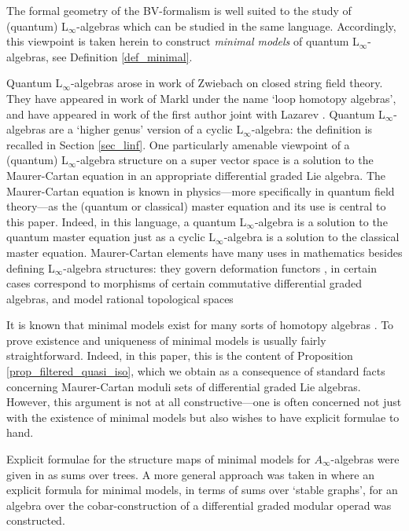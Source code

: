 \documentclass[]{amsart}
\theoremstyle{definition}
\newcommand{\Linf}{L$_\infty$}
\begin{document}
The formal geometry of the BV-formalism is well suited to the study of (quantum) \Linf-algebras which can be studied in the same language. Accordingly, this viewpoint is taken herein to construct \emph{minimal models} of quantum \Linf-algebras, see Definition \ref{def_minimal}.

Quantum \Linf-algebras arose in work of Zwiebach \cite{zwiebach} on closed string field theory. They have appeared in work of Markl \cite{markl_loop_homotopy} under the name `loop homotopy algebras', and have appeared in work of the first author joint with Lazarev \cite{braun_laz_unimodular}. Quantum \Linf-algebras are a `higher genus' version of a cyclic \Linf-algebra: the definition is recalled in Section \ref{sec_linf}. One particularly amenable viewpoint of a (quantum) \Linf-algebra structure on a super vector space is a solution to the Maurer-Cartan equation in an appropriate differential graded Lie algebra. The Maurer-Cartan equation is known in physics---more specifically in quantum field theory---as the (quantum or classical) master equation and its use is central to this paper. Indeed, in this language, a quantum \Linf-algebra is a solution to the quantum master equation just as a cyclic \Linf-algebra is a solution to the classical master equation. Maurer-Cartan elements have many uses in mathematics besides defining \Linf-algebra structures: they govern deformation functors \cite{braun,manetti,maunder_koszul_duality,pridham,schlessinger_stasheff_deformation_rational}, in certain cases correspond to morphisms of certain commutative differential graded algebras, and model rational topological spaces \cite{hinich_stacks,andrey_MC,laz_markl,maunder_unbased_rat_homo,quillen}

It is known that minimal models exist for many sorts of homotopy algebras \cite{kadeishvili,kontsevich}. To prove existence and uniqueness of minimal models is usually fairly straightforward. Indeed, in this paper, this is the content of Proposition \ref{prop_filtered_quasi_iso}, which we obtain as a consequence of standard facts concerning Maurer-Cartan moduli sets of differential graded Lie algebras. However, this argument is not at all constructive---one is often concerned not just with the existence of minimal models but also wishes to have explicit formulae to hand.

Explicit formulae for the structure maps of minimal models for $A_\infty$-algebras were given in \cite{kontsevich_soibelman,markl_transferring,merkulov} as sums over trees. A more general approach was taken in \cite{chuang_laz_feynman} where an explicit formula for minimal models, in terms of sums over `stable graphs', for an algebra over the cobar-construction of a differential graded modular operad was constructed.
\end{document}
